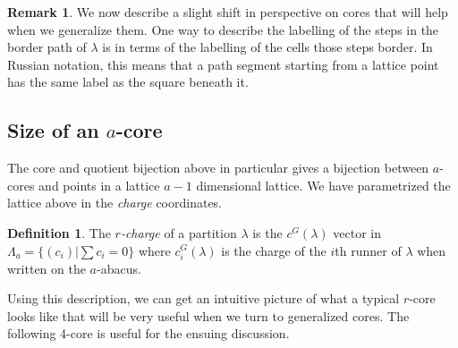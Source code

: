 \documentclass{amsart}[12pt]
\theoremstyle{definition}
\newtheorem{definition}[dummy]{Definition}
\newtheorem{remark}[dummy]{Remark}
\begin{document}
\begin{remark}
We now describe a slight shift in perspective on cores that will help when we generalize them.  One way to describe the labelling of the steps in the border path of $\lambda$ is in terms of the labelling of the cells those steps border.  In Russian notation, this means that a path segment starting from a lattice point has the same label as the square beneath it.



\subsection{Size of an \texorpdfstring{$a$}{a}-core}
The core and quotient bijection above in particular gives a bijection between $a$-cores and points in a lattice $a-1$ dimensional lattice.  We have parametrized the lattice above in the \emph{charge} coordinates.  


\begin{definition}
The \emph{$r$-charge} of a partition $\lambda$ is the $c^G(\lambda)$ vector in $\Lambda_a=\{(c_i)|\sum c_i=0\}$ where $c_i^G(\lambda)$ is the charge of the $i$th runner of $\lambda$ when written on the $a$-abacus.
\end{definition}

Using this description, we can get an intuitive picture of what a typical $r$-core looks like that will be very useful when we turn to generalized cores.  The following 4-core is useful for the ensuing discussion.


\end{remark}
\end{document}
